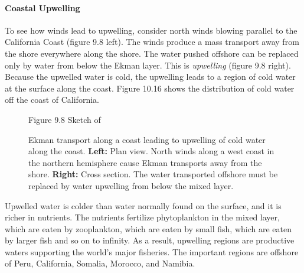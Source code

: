 \paragraph{Coastal Upwelling}
To see how winds lead to
upwelling, consider north winds blowing
parallel to the California Coast (figure 9.8 left). The winds produce
a mass transport away from the shore
everywhere along the shore. The water pushed offshore can be replaced
only by water from below the Ekman layer. This is
\textit{upwelling} (figure 9.8 right). Because
the upwelled water is cold, the upwelling leads to a region of cold
water at the surface along the coast. Figure 10.16 shows the
distribution of cold water off the coast of California.
\begin{figure}[t!]
\footnotesize
Figure 9.8 Sketch of \rule{0mm}{5ex}Ekman transport along a coast
leading to upwelling of cold water along the
coast. \textbf{Left:} Plan view. North winds along a west coast in the
northern hemisphere cause Ekman transports away from the
shore. \textbf{Right:} Cross section. The water transported offshore
must be replaced by water upwelling from below the mixed
layer.
\label{fig:upwelling}
\vspace{-3ex}
\end{figure}

Upwelled water is colder than water normally found on the surface, and
it is richer in nutrients. The nutrients fertilize phytoplankton in
the mixed layer, which are eaten
by zooplankton, which are eaten by small fish, which are eaten by
larger fish and so on to infinity. As a result,
upwelling regions are productive waters
supporting the world's major fisheries. The important regions are
offshore of Peru, California, Somalia, Morocco, and Namibia.

